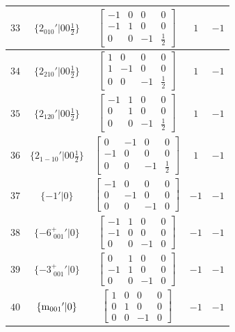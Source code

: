 \documentclass[fleqn,8pt]{jsarticle}
\begin{document}
\begin{longtable}{ccccc}
$ 33 $ & $ \{2{}_{010}{}'|0 0 \frac{1}{2}\} $ & $ \begin{bmatrix} -1 & 0 & 0 & 0 \\ -1 & 1 & 0 & 0 \\ 0 & 0 & -1 & \frac{1}{2} \end{bmatrix} $ & $ 1 $ & $ -1 $ \\ \hline
$ 34 $ & $ \{2{}_{210}{}'|0 0 \frac{1}{2}\} $ & $ \begin{bmatrix} 1 & 0 & 0 & 0 \\ 1 & -1 & 0 & 0 \\ 0 & 0 & -1 & \frac{1}{2} \end{bmatrix} $ & $ 1 $ & $ -1 $ \\ \hline
$ 35 $ & $ \{2{}_{120}{}'|0 0 \frac{1}{2}\} $ & $ \begin{bmatrix} -1 & 1 & 0 & 0 \\ 0 & 1 & 0 & 0 \\ 0 & 0 & -1 & \frac{1}{2} \end{bmatrix} $ & $ 1 $ & $ -1 $ \\ \hline
$ 36 $ & $ \{2{}_{1-10}{}'|0 0 \frac{1}{2}\} $ & $ \begin{bmatrix} 0 & -1 & 0 & 0 \\ -1 & 0 & 0 & 0 \\ 0 & 0 & -1 & \frac{1}{2} \end{bmatrix} $ & $ 1 $ & $ -1 $ \\ \hline
$ 37 $ & $ \{-1{}'|0\} $ & $ \begin{bmatrix} -1 & 0 & 0 & 0 \\ 0 & -1 & 0 & 0 \\ 0 & 0 & -1 & 0 \end{bmatrix} $ & $ -1 $ & $ -1 $ \\ \hline
$ 38 $ & $ \{-6^{+}_{\,\,001}{}'|0\} $ & $ \begin{bmatrix} -1 & 1 & 0 & 0 \\ -1 & 0 & 0 & 0 \\ 0 & 0 & -1 & 0 \end{bmatrix} $ & $ -1 $ & $ -1 $ \\ \hline
$ 39 $ & $ \{-3^{+}_{\,\,001}{}'|0\} $ & $ \begin{bmatrix} 0 & 1 & 0 & 0 \\ -1 & 1 & 0 & 0 \\ 0 & 0 & -1 & 0 \end{bmatrix} $ & $ -1 $ & $ -1 $ \\ \hline
$ 40 $ & $ \{{\rm m}_{001}{}'|0\} $ & $ \begin{bmatrix} 1 & 0 & 0 & 0 \\ 0 & 1 & 0 & 0 \\ 0 & 0 & -1 & 0 \end{bmatrix} $ & $ -1 $ & $ -1 $ \\ \hline

\end{longtable}
\end{document}
